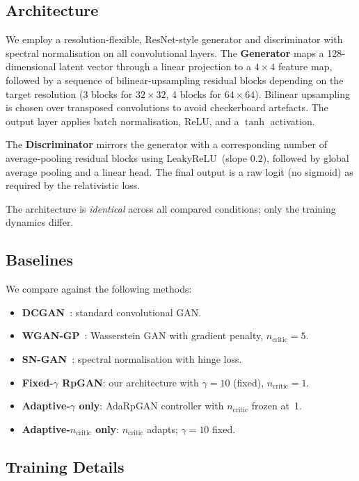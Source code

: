 \documentclass[journal]{IEEEtran}
\newcommand{\ncritic}{n_{\mathrm{critic}}}
\begin{document}
\subsection{Architecture}

We employ a resolution-flexible, ResNet-style generator and discriminator with spectral normalisation on all convolutional layers. The \textbf{Generator} maps a 128-dimensional latent vector through a linear projection to a $4{\times}4$ feature map, followed by a sequence of bilinear-upsampling residual blocks depending on the target resolution (3 blocks for $32{\times}32$, 4 blocks for $64{\times}64$). Bilinear upsampling is chosen over transposed convolutions to avoid checkerboard artefacts. The output layer applies batch normalisation, ReLU, and a $\tanh$ activation.

The \textbf{Discriminator} mirrors the generator with a corresponding number of average-pooling residual blocks using LeakyReLU~(slope $0.2$), followed by global average pooling and a linear head. The final output is a raw logit (no sigmoid) as required by the relativistic loss.

The architecture is \emph{identical} across all compared conditions; only the training dynamics differ.

\subsection{Baselines}

We compare against the following methods:
\begin{itemize}
    \item \textbf{DCGAN}~\cite{radford2016unsupervised}: standard convolutional GAN.
    \item \textbf{WGAN-GP}~\cite{gulrajani2017improved}: Wasserstein GAN with gradient penalty, $\ncritic=5$.
    \item \textbf{SN-GAN}~\cite{miyato2018spectral}: spectral normalisation with hinge loss.
    \item \textbf{Fixed-$\gamma$ RpGAN}: our architecture with $\gamma=10$ (fixed), $\ncritic=1$.
    \item \textbf{Adaptive-$\gamma$ only}: AdaRpGAN controller with $\ncritic$ frozen at~1.
    \item \textbf{Adaptive-$\ncritic$ only}: $\ncritic$ adapts; $\gamma=10$ fixed.
\end{itemize}

\subsection{Training Details}
\end{document}
